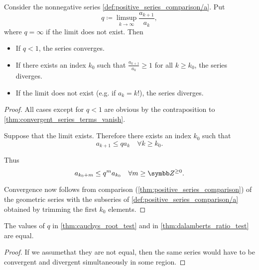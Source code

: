 \begin{proposition}\label{thm:dalamberts_ratio_test}\cite[theorem 3.33]{Rudin1976}
  Consider the nonnegative series \cref{def:positive_series_comparison/a}. Put
  \begin{equation*}
    q \coloneqq \limsup_{k \to \infty} \frac {a_{k+1}} {a_k},
  \end{equation*}
  where \( q = \infty \) if the limit does not exist. Then
  \begin{itemize}
    \item If \( q < 1 \), the series converges.
    \item If there exists an index \( k_0 \) such that \( \frac {a_{k+1}} {a_k} \geq 1 \) for all \( k \geq k_0 \), the series diverges.
    \item If the limit does not exist (e.g. if \( a_k = k! \)), the series diverges.
  \end{itemize}
\end{proposition}
\begin{proof}
  All cases except for \( q < 1 \) are obvious by the contraposition to \cref{thm:convergent_series_terms_vanish}.

  Suppose that the limit exists. Therefore there exists an index \( k_0 \) such that
  \begin{equation*}
    a_{k+1} \leq q a_k \quad\forall k \geq k_0.
  \end{equation*}

  Thus
  \begin{equation*}
    a_{k_0 + m} \leq q^m a_{k_0} \quad\forall m \geq \BZ^{\geq 0}.
  \end{equation*}

  Convergence now follows from comparison (\cref{thm:positive_series_comparison}) of the geometric series with the subseries of \cref{def:positive_series_comparison/a} obtained by trimming the first \( k_0 \) elements.
\end{proof}

\begin{proposition}\label{remark:nonnegative_series_convergence_test_equivalence}
  The values of \( q \) in \cref{thm:cauchys_root_test} and in \cref{thm:dalamberts_ratio_test} are equal.
\end{proposition}
\begin{proof}
  If we assume\LEM that they are not equal, then the same series would have to be convergent and divergent simultaneously in some region.
\end{proof}

